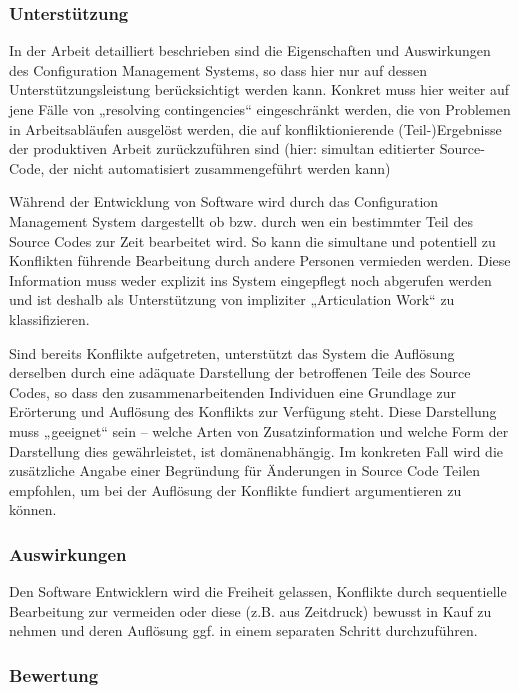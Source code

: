 \subsubsection{Unterstützung}

In der Arbeit detailliert beschrieben sind die Eigenschaften und Auswirkungen des Configuration Management Systems, so dass hier nur auf dessen Unterstützungsleistung berücksichtigt werden kann. Konkret muss hier weiter auf jene Fälle von „resolving contingencies“ eingeschränkt werden, die von Problemen in Arbeitsabläufen ausgelöst werden, die auf konfliktionierende (Teil-)Ergebnisse der produktiven Arbeit zurückzuführen sind (hier: simultan editierter Source-Code, der nicht automatisiert zusammengeführt werden kann)

Während der Entwicklung von Software wird durch das Configuration Management System dargestellt ob bzw. durch wen ein bestimmter Teil des Source Codes zur Zeit bearbeitet wird. So kann die simultane und potentiell zu Konflikten führende Bearbeitung durch andere Personen vermieden werden. Diese Information muss weder explizit ins System eingepflegt noch abgerufen werden und ist deshalb als Unterstützung von impliziter „Articulation Work“ zu klassifizieren.

Sind bereits Konflikte aufgetreten, unterstützt das System die Auflösung derselben durch eine adäquate Darstellung der betroffenen Teile des Source Codes, so dass den zusammenarbeitenden Individuen eine Grundlage zur Erörterung und Auflösung des Konflikts zur Verfügung steht. Diese Darstellung muss „geeignet“ sein -- welche Arten von Zusatzinformation und welche Form der Darstellung dies gewährleistet, ist domänenabhängig. Im konkreten Fall wird die zusätzliche Angabe einer Begründung für Änderungen in Source Code Teilen empfohlen, um bei der Auflösung der Konflikte fundiert argumentieren zu können.

\subsubsection{Auswirkungen}

Den Software Entwicklern wird die Freiheit gelassen, Konflikte durch sequentielle Bearbeitung zur vermeiden oder diese (z.B. aus Zeitdruck) bewusst in Kauf zu nehmen und deren Auflösung ggf. in einem separaten Schritt durchzuführen.

\subsubsection{Bewertung}

